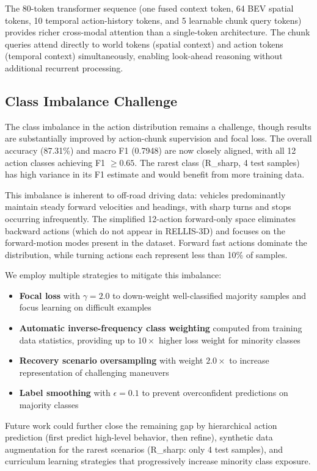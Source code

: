 \documentclass[sensors,article,submit,pdftex,moreauthors]{Definitions/mdpi}
\begin{document}
The 80-token transformer sequence (one fused context token, 64 BEV spatial tokens, 10 temporal action-history tokens, and 5 learnable chunk query tokens) provides richer cross-modal attention than a single-token architecture. The chunk queries attend directly to world tokens (spatial context) and action tokens (temporal context) simultaneously, enabling look-ahead reasoning without additional recurrent processing.

\subsection{Class Imbalance Challenge}

The class imbalance in the action distribution remains a challenge, though results are substantially improved by action-chunk supervision and focal loss. The overall accuracy (87.31\%) and macro F1 (0.7948) are now closely aligned, with all 12 action classes achieving F1 $\geq 0.65$. The rarest class (R\_sharp, 4 test samples) has high variance in its F1 estimate and would benefit from more training data.

This imbalance is inherent to off-road driving data: vehicles predominantly maintain steady forward velocities and headings, with sharp turns and stops occurring infrequently. The simplified 12-action forward-only space eliminates backward actions (which do not appear in RELLIS-3D) and focuses on the forward-motion modes present in the dataset. Forward fast actions dominate the distribution, while turning actions each represent less than 10\% of samples.

We employ multiple strategies to mitigate this imbalance:
\begin{itemize}
    \item \textbf{Focal loss} \cite{lin2017} with $\gamma = 2.0$ to down-weight well-classified majority samples and focus learning on difficult examples
    \item \textbf{Automatic inverse-frequency class weighting} computed from training data statistics, providing up to $10\times$ higher loss weight for minority classes
    \item \textbf{Recovery scenario oversampling} with weight $2.0\times$ to increase representation of challenging maneuvers
    \item \textbf{Label smoothing} with $\epsilon = 0.1$ to prevent overconfident predictions on majority classes
\end{itemize}

Future work could further close the remaining gap by hierarchical action prediction (first predict high-level behavior, then refine), synthetic data augmentation for the rarest scenarios (R\_sharp: only 4 test samples), and curriculum learning strategies that progressively increase minority class exposure.
\end{document}
